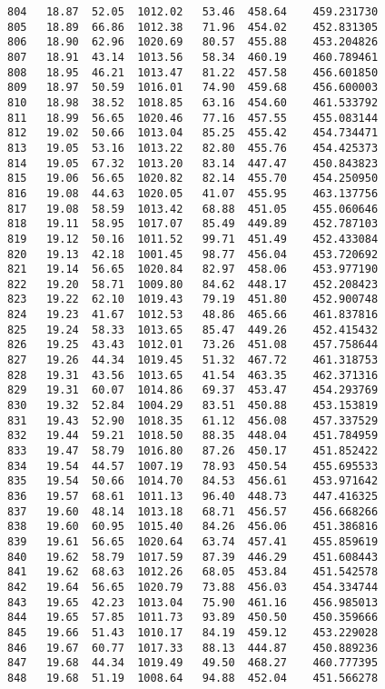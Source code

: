\documentclass[11pt]{article}
\begin{document}
\begin{tcolorbox}[breakable, size=fbox, boxrule=.5pt, pad at break*=1mm, opacityfill=0]
\begin{Verbatim}[commandchars=\\\{\}]
804   18.87  52.05  1012.02   53.46  458.64    459.231730
805   18.89  66.86  1012.38   71.96  454.02    452.831305
806   18.90  62.96  1020.69   80.57  455.88    453.204826
807   18.91  43.14  1013.56   58.34  460.19    460.789461
808   18.95  46.21  1013.47   81.22  457.58    456.601850
809   18.97  50.59  1016.01   74.90  459.68    456.600003
810   18.98  38.52  1018.85   63.16  454.60    461.533792
811   18.99  56.65  1020.46   77.16  457.55    455.083144
812   19.02  50.66  1013.04   85.25  455.42    454.734471
813   19.05  53.16  1013.22   82.80  455.76    454.425373
814   19.05  67.32  1013.20   83.14  447.47    450.843823
815   19.06  56.65  1020.82   82.14  455.70    454.250950
816   19.08  44.63  1020.05   41.07  455.95    463.137756
817   19.08  58.59  1013.42   68.88  451.05    455.060646
818   19.11  58.95  1017.07   85.49  449.89    452.787103
819   19.12  50.16  1011.52   99.71  451.49    452.433084
820   19.13  42.18  1001.45   98.77  456.04    453.720692
821   19.14  56.65  1020.84   82.97  458.06    453.977190
822   19.20  58.71  1009.80   84.62  448.17    452.208423
823   19.22  62.10  1019.43   79.19  451.80    452.900748
824   19.23  41.67  1012.53   48.86  465.66    461.837816
825   19.24  58.33  1013.65   85.47  449.26    452.415432
826   19.25  43.43  1012.01   73.26  451.08    457.758644
827   19.26  44.34  1019.45   51.32  467.72    461.318753
828   19.31  43.56  1013.65   41.54  463.35    462.371316
829   19.31  60.07  1014.86   69.37  453.47    454.293769
830   19.32  52.84  1004.29   83.51  450.88    453.153819
831   19.43  52.90  1018.35   61.12  456.08    457.337529
832   19.44  59.21  1018.50   88.35  448.04    451.784959
833   19.47  58.79  1016.80   87.26  450.17    451.852422
834   19.54  44.57  1007.19   78.93  450.54    455.695533
835   19.54  50.66  1014.70   84.53  456.61    453.971642
836   19.57  68.61  1011.13   96.40  448.73    447.416325
837   19.60  48.14  1013.18   68.71  456.57    456.668266
838   19.60  60.95  1015.40   84.26  456.06    451.386816
839   19.61  56.65  1020.64   63.74  457.41    455.859619
840   19.62  58.79  1017.59   87.39  446.29    451.608443
841   19.62  68.63  1012.26   68.05  453.84    451.542578
842   19.64  56.65  1020.79   73.88  456.03    454.334744
843   19.65  42.23  1013.04   75.90  461.16    456.985013
844   19.65  57.85  1011.73   93.89  450.50    450.359666
845   19.66  51.43  1010.17   84.19  459.12    453.229028
846   19.67  60.77  1017.33   88.13  444.87    450.889236
847   19.68  44.34  1019.49   49.50  468.27    460.777395
848   19.68  51.19  1008.64   94.88  452.04    451.566278

\end{Verbatim}
\end{tcolorbox}
\end{document}
